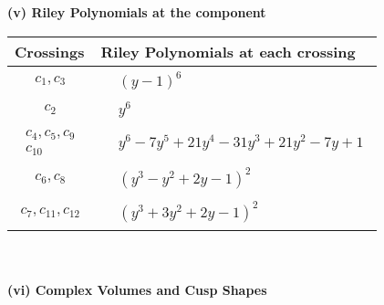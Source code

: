 \documentclass[1p]{elsarticle_modified}
\theoremstyle{definition}
\begin{document}
\newpage\renewcommand{\arraystretch}{1}
\flushleft \textbf{(v) Riley Polynomials at the component}\newline \\
\begin{tabular}{m{50pt}|m{274pt}}
Crossings & \hspace{64pt}Riley Polynomials at each crossing \\
\hline $$\begin{aligned}c_{1},c_{3}\end{aligned}$$&$\begin{aligned}
&(y-1)^6
\end{aligned}$\\
\hline $$\begin{aligned}c_{2}\end{aligned}$$&$\begin{aligned}
&y^6
\end{aligned}$\\
\hline $$\begin{aligned}c_{4},c_{5},c_{9}\\c_{10}\end{aligned}$$&$\begin{aligned}
&y^6-7 y^5+21 y^4-31 y^3+21 y^2-7 y+1
\end{aligned}$\\
\hline $$\begin{aligned}c_{6},c_{8}\end{aligned}$$&$\begin{aligned}
&(y^3- y^2+2 y-1)^2
\end{aligned}$\\
\hline $$\begin{aligned}c_{7},c_{11},c_{12}\end{aligned}$$&$\begin{aligned}
&(y^3+3 y^2+2 y-1)^2
\end{aligned}$\\
\hline
\end{tabular}\\~\\
\newpage\flushleft \textbf{(vi) Complex Volumes and Cusp Shapes}
\end{document}

